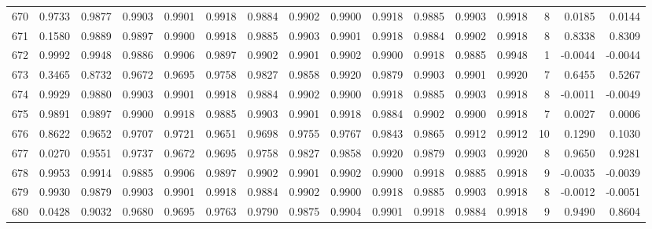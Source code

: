 \begin{tabular}{lrrrrrrrrrrrrrrr}
670 &      0.9733 &  0.9877 &  0.9903 &  0.9901 &  0.9918 &  0.9884 &  0.9902 &  0.9900 &  0.9918 &  0.9885 &   0.9903 &     0.9918 &      8 &                    0.0185 &                     0.0144 \\
671 &      0.1580 &  0.9889 &  0.9897 &  0.9900 &  0.9918 &  0.9885 &  0.9903 &  0.9901 &  0.9918 &  0.9884 &   0.9902 &     0.9918 &      8 &                    0.8338 &                     0.8309 \\
672 &      0.9992 &  0.9948 &  0.9886 &  0.9906 &  0.9897 &  0.9902 &  0.9901 &  0.9902 &  0.9900 &  0.9918 &   0.9885 &     0.9948 &      1 &                   -0.0044 &                    -0.0044 \\
673 &      0.3465 &  0.8732 &  0.9672 &  0.9695 &  0.9758 &  0.9827 &  0.9858 &  0.9920 &  0.9879 &  0.9903 &   0.9901 &     0.9920 &      7 &                    0.6455 &                     0.5267 \\
674 &      0.9929 &  0.9880 &  0.9903 &  0.9901 &  0.9918 &  0.9884 &  0.9902 &  0.9900 &  0.9918 &  0.9885 &   0.9903 &     0.9918 &      8 &                   -0.0011 &                    -0.0049 \\
675 &      0.9891 &  0.9897 &  0.9900 &  0.9918 &  0.9885 &  0.9903 &  0.9901 &  0.9918 &  0.9884 &  0.9902 &   0.9900 &     0.9918 &      7 &                    0.0027 &                     0.0006 \\
676 &      0.8622 &  0.9652 &  0.9707 &  0.9721 &  0.9651 &  0.9698 &  0.9755 &  0.9767 &  0.9843 &  0.9865 &   0.9912 &     0.9912 &     10 &                    0.1290 &                     0.1030 \\
677 &      0.0270 &  0.9551 &  0.9737 &  0.9672 &  0.9695 &  0.9758 &  0.9827 &  0.9858 &  0.9920 &  0.9879 &   0.9903 &     0.9920 &      8 &                    0.9650 &                     0.9281 \\
678 &      0.9953 &  0.9914 &  0.9885 &  0.9906 &  0.9897 &  0.9902 &  0.9901 &  0.9902 &  0.9900 &  0.9918 &   0.9885 &     0.9918 &      9 &                   -0.0035 &                    -0.0039 \\
679 &      0.9930 &  0.9879 &  0.9903 &  0.9901 &  0.9918 &  0.9884 &  0.9902 &  0.9900 &  0.9918 &  0.9885 &   0.9903 &     0.9918 &      8 &                   -0.0012 &                    -0.0051 \\
680 &      0.0428 &  0.9032 &  0.9680 &  0.9695 &  0.9763 &  0.9790 &  0.9875 &  0.9904 &  0.9901 &  0.9918 &   0.9884 &     0.9918 &      9 &                    0.9490 &                     0.8604 \\

\end{tabular}
